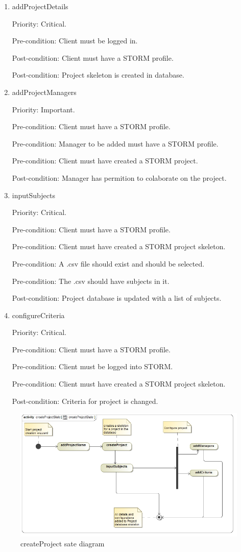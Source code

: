 \begin{enumerate}
\item addProjectDetails\par
Priority: Critical.\par
Pre-condition: Client must be logged in.\par
Post-condition: Client must have a STORM profile.\par
Post-condition: Project skeleton is created in database.\par
\item addProjectManagers\par
Priority: Important.\par
Pre-condition: Client must have a STORM profile.\par
Pre-condition: Manager to be added must have a STORM profile.\par
Pre-condition: Client must have created a STORM project.\par
Post-condition: Manager has permition to colaborate on the project.\par
\item inputSubjects\par
Priority: Critical.\par
Pre-condition: Client must have a STORM profile.\par
Pre-condition: Client must have created a STORM project skeleton.\par
Pre-condition: A .csv file should exist and should be selected.\par
Pre-condition: The .csv should have subjects in it.\par
Post-condition: Project database is updated with a list of subjects.\par
\item configureCriteria\par
Priority: Critical.\par
Pre-condition: Client must have a STORM profile.\par
Pre-condition: Client must be logged into STORM.\par
Pre-condition: Client must have created a STORM project skeleton.\par
Post-condition: Criteria for project is changed.\par
\end{enumerate}
\begin{figure}[h]
    \centering
    \includegraphics[width=15cm]{./graphics/createProjectState.jpg}
    \caption{createProject sate diagram}
    \label{fig:createProject_state}
\end{figure}